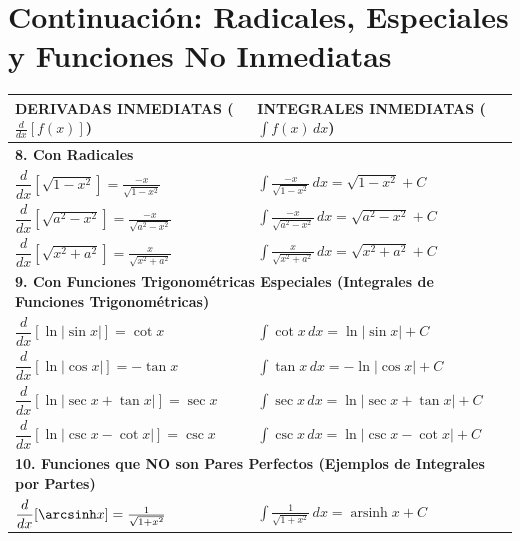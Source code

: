 \documentclass{article}
\newcommand{\deriv}[2]{\frac{d#1}{d#2}}
\newcommand{\integral}[2]{\int #1 \, d#2}
\begin{document}
\newpage %

\section{Continuación: Radicales, Especiales y Funciones No Inmediatas}
\label{sec:tabla_paralela_continuacion}

\begin{center}
\footnotesize %
\setlength{\tabcolsep}{4pt} %
\begin{tabular}{|p{}|p{}|}
\toprule
\textbf{DERIVADAS INMEDIATAS} ($\deriv{}{x}[f(x)]$) & \textbf{INTEGRALES INMEDIATAS} ($\integral{f(x)}{x}$) \\
\midrule
\multicolumn{2}{|l|}{\textbf{8. Con Radicales}} \\
\midrule
$\dfrac{d}{dx}[\sqrt{1-x^2}] = \frac{-x}{\sqrt{1-x^2}}$ & $\displaystyle\int \frac{-x}{\sqrt{1-x^2}} \, dx = \sqrt{1-x^2} + C$ \\
$\dfrac{d}{dx}[\sqrt{a^2-x^2}] = \frac{-x}{\sqrt{a^2-x^2}}$ & $\displaystyle\int \frac{-x}{\sqrt{a^2-x^2}} \, dx = \sqrt{a^2-x^2} + C$ \\
$\dfrac{d}{dx}[\sqrt{x^2+a^2}] = \frac{x}{\sqrt{x^2+a^2}}$ & $\displaystyle\int \frac{x}{\sqrt{x^2+a^2}} \, dx = \sqrt{x^2+a^2} + C$ \\
\midrule
\multicolumn{2}{|l|}{\textbf{9. Con Funciones Trigonométricas Especiales (Integrales de Funciones Trigonométricas)}} \\
\midrule
$\dfrac{d}{dx}[\ln|\sin x|] = \cot x$ & $\displaystyle\int \cot x \, dx = \ln|\sin x| + C$ \\
$\dfrac{d}{dx}[\ln|\cos x|] = -\tan x$ & $\displaystyle\int \tan x \, dx = -\ln|\cos x| + C$ \\
$\dfrac{d}{dx}[\ln|\sec x+\tan x|] = \sec x$ & $\displaystyle\int \sec x \, dx = \ln|\sec x+\tan x| + C$ \\
$\dfrac{d}{dx}[\ln|\csc x-\cot x|] = \csc x$ & $\displaystyle\int \csc x \, dx = \ln|\csc x-\cot x| + C$ \\
\midrule
\multicolumn{2}{|l|}{\textbf{10. Funciones que NO son Pares Perfectos (Ejemplos de Integrales por Partes)}} \\
\midrule
$\dfrac{d}{dx}[\arcsinh x] = \frac{1}{\sqrt{1+x^2}}$ & $\displaystyle\int \frac{1}{\sqrt{1+x^2}} \, dx = \operatorname{arsinh} x + C$ \\

\end{tabular}
\end{center}
\end{document}
